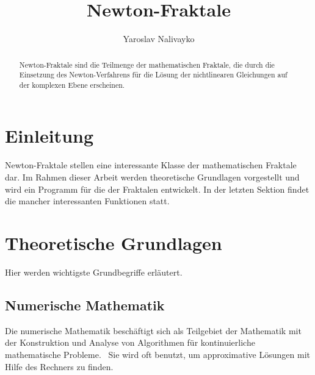 \documentclass[a4paper,12pt]{llncs}
\numberwithin{equation}{section}
\begin{document}


\author{Yaroslav Nalivayko}

\title{Newton-Fraktale}

\maketitle

\thispagestyle{empty}

\begin{abstract}
Newton-Fraktale sind die Teilmenge der mathematischen Fraktale, die durch die Einsetzung des Newton-Verfahrens für die Lösung der nichtlinearen Gleichungen auf der komplexen Ebene erscheinen.
\end{abstract}

\section{Einleitung}
Newton-Fraktale stellen eine interessante Klasse der mathematischen Fraktale dar. 
Im Rahmen dieser Arbeit werden theoretische Grundlagen vorgestellt und wird ein Programm für die  der Fraktalen entwickelt. In der letzten Sektion findet die  mancher interessanten Funktionen statt.


\section{Theoretische Grundlagen}\label{sec:theo}
Hier werden wichtigste Grundbegriffe erläutert.

\subsection{Numerische Mathematik}
Die numerische Mathematik beschäftigt sich als Teilgebiet der Mathematik mit der Konstruktion und Analyse von Algorithmen für kontinuierliche mathematische Probleme.~\cite{nummath}
Sie wird oft benutzt, um approximative Lösungen mit Hilfe des Rechners zu finden.
\end{document}
